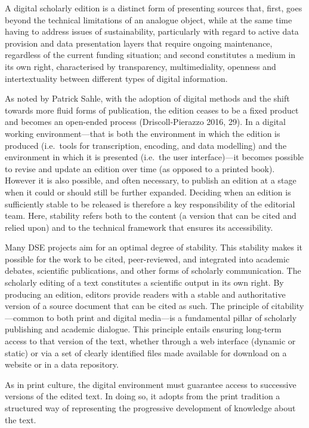 \documentclass[
  letterpaper,
  DIV=11,
  numbers=noendperiod]{scrreprt}
\begin{document}
A digital scholarly edition is a distinct form of presenting sources
that, first, goes beyond the technical limitations of an analogue
object, while at the same time having to address issues of
sustainability, particularly with regard to active data provision and
data presentation layers that require ongoing maintenance, regardless of
the current funding situation; and second constitutes a medium in its
own right, characterised by transparency, multimediality, openness and
intertextuality between different types of digital information.

As noted by Patrick Sahle, with the adoption of digital methods and the
shift towards more fluid forms of publication, the edition ceases to be
a fixed product and becomes an open-ended process (Driscoll-Pierazzo
2016, 29). In a digital working environment---that is both the
environment in which the edition is produced (i.e.~tools for
transcription, encoding, and data modelling) and the environment in
which it is presented (i.e.~the user interface)---it becomes possible to
revise and update an edition over time (as opposed to a printed book).
However it is also possible, and often necessary, to publish an edition
at a stage when it could or should still be further expanded. Deciding
when an edition is sufficiently stable to be released is therefore a key
responsibility of the editorial team. Here, stability refers both to the
content (a version that can be cited and relied upon) and to the
technical framework that ensures its accessibility.

Many DSE projects aim for an optimal degree of stability. This stability
makes it possible for the work to be cited, peer-reviewed, and
integrated into academic debates, scientific publications, and other
forms of scholarly communication. The scholarly editing of a text
constitutes a scientific output in its own right. By producing an
edition, editors provide readers with a stable and authoritative version
of a source document that can be cited as such. The principle of
citability---common to both print and digital media---is a fundamental
pillar of scholarly publishing and academic dialogue. This principle
entails ensuring long-term access to that version of the text, whether
through a web interface (dynamic or static) or via a set of clearly
identified files made available for download on a website or in a data
repository.

As in print culture, the digital environment must guarantee access to
successive versions of the edited text. In doing so, it adopts from the
print tradition a structured way of representing the progressive
development of knowledge about the text.
\end{document}
